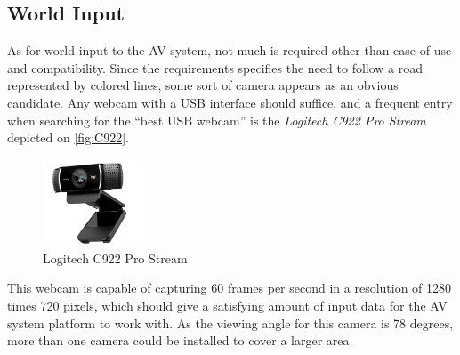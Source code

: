 \subsection{World Input}\label{ssec:optimalHardwareWorldInput}
As for world input to the AV system, not much is required other than ease of use and compatibility.
Since the requirements specifies the need to follow a road represented by colored lines, some sort of camera appears as an obvious candidate.
Any webcam with a USB interface should suffice, and a frequent entry when searching for the ``best USB webcam'' is the \textit{Logitech C922 Pro Stream} \cite{WebcamSearch1, WebcamSearch2, WebcamSearch3} depicted on \autoref{fig:C922}.
\begin{figure}[H]
  \centering
  \includegraphics[width=3cm]{images/techAnalysis/c922.png}
  \caption{Logitech C922 Pro Stream}
  \label{fig:C922}
\end{figure}
This webcam is capable of capturing 60 frames per second in a resolution of 1280 times 720 pixels, which should give a satisfying amount of input data for the AV system platform to work with.
As the viewing angle for this camera is 78 degrees, more than one camera could be installed to cover a larger area.
